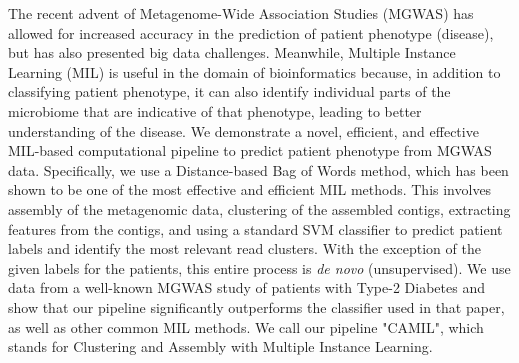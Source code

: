 
The recent advent of Metagenome-Wide Association Studies (MGWAS) has allowed for increased accuracy in the prediction of patient phenotype (disease), but has also presented big data challenges. Meanwhile, Multiple Instance Learning (MIL) is useful in the domain of bioinformatics because, in addition to classifying patient phenotype, it can also identify individual parts of the microbiome that are indicative of that phenotype, leading to better understanding of the disease. We demonstrate a novel, efficient, and effective MIL-based computational pipeline to predict patient phenotype from MGWAS data. Specifically, we use a Distance-based Bag of Words method, which has been shown to be one of the most effective and efficient MIL methods. This involves assembly of the metagenomic data, clustering of the assembled contigs, extracting features from the contigs, and using a standard SVM classifier to predict patient labels and identify the most relevant read clusters. With the exception of the given labels for the patients, this entire process is \emph{de novo} (unsupervised). We use data from a well-known MGWAS study of patients with Type-2 Diabetes and show that our pipeline significantly outperforms the classifier used in that paper, as well as other common MIL methods. We call our pipeline "CAMIL", which stands for Clustering and Assembly with Multiple Instance Learning.
